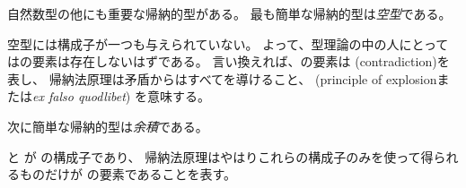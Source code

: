 \documentclass[index]{subfiles}
\begin{document}

自然数型の他にも重要な帰納的型がある。
最も簡単な帰納的型は\emph{空型}である。



空型には構成子が一つも与えられていない。
よって、型理論の中の人にとっては\myInlineMath{\myEmptyType}の要素は存在しないはずである。
言い換えれば、\myInlineMath{\myEmptyType}の要素は
(contradiction)を表し、
帰納法原理は矛盾からはすべてを導けること、
(principle of explosionまたは\textit{ex falso quodlibet})
を意味する。

次に簡単な帰納的型は\emph{余積}である。



と
が
の構成子であり、
帰納法原理はやはりこれらの構成子のみを使って得られるものだけが
の要素であることを表す。
\end{document}
